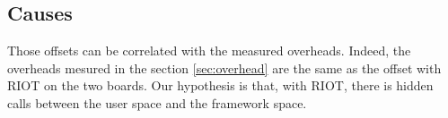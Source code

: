 \subsection{Causes}

Those offsets can be correlated with the measured overheads.
Indeed, the overheads mesured in the section \ref{sec:overhead} are the same as the offset with RIOT on the two boards.
Our hypothesis is that, with RIOT, there is hidden calls between the user space and the framework space.